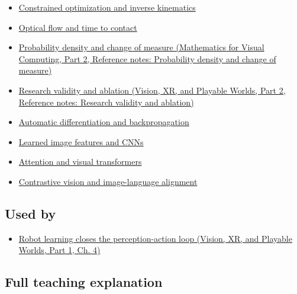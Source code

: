 \hypertarget{appendix-b0c42da325f1-prerequisites}{}

\begin{itemize}
\tightlist
\item
  \hyperref[appendix-29f4bea4c2bb]{Constrained optimization and inverse kinematics}
\item
  \hyperref[appendix-e2e73f8cd93e]{Optical flow and time to contact}
\item
  \href{../02-Mathematics-for-Visual-Computing-P02/main.pdf\#nameddest=appendix-4815cd87ab8b}{Probability density and change of measure (Mathematics for Visual Computing, Part 2, Reference notes: Probability density and change of measure)}
\item
  \href{../07-Vision-XR-and-Playable-Worlds-P02/main.pdf\#nameddest=appendix-65788587ef78}{Research validity and ablation (Vision, XR, and Playable Worlds, Part 2, Reference notes: Research validity and ablation)}
\item
  \hyperref[appendix-40df0855b4a7]{Automatic differentiation and backpropagation}
\item
  \hyperref[appendix-47c51ea026fb]{Learned image features and CNNs}
\item
  \hyperref[appendix-a9d5dfdd164a]{Attention and visual transformers}
\item
  \hyperref[appendix-772f1fd96148]{Contrastive vision and image-language alignment}
\end{itemize}

\subsection{Used by}\label{appendix-b0c42da325f1-used-by}

\hypertarget{appendix-b0c42da325f1-used-by}{}

\begin{itemize}
\tightlist
\item
  \href{../07-Vision-XR-and-Playable-Worlds-P01/main.pdf\#nameddest=04-visual-computing-ii-ch034-robot-learning-closes-the-perception-action-loop}{Robot learning closes the perception-action loop (Vision, XR, and Playable Worlds, Part 1, Ch. 4)}
\end{itemize}

\subsection{Full teaching explanation}\label{appendix-b0c42da325f1-full-teaching-explanation}


